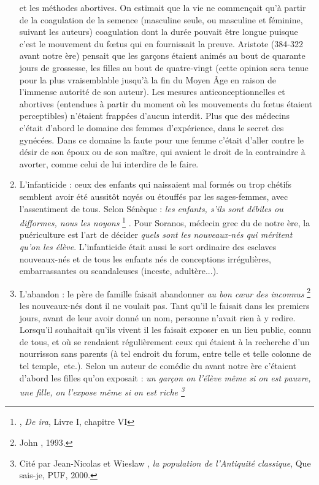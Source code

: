 \begin{enumerate}
et les méthodes abortives. On estimait que la vie ne
commençait qu'à partir de la coagulation de la semence (masculine seule,
ou masculine et féminine, suivant les auteurs) coagulation dont la durée
pouvait être longue puisque c'est le mouvement du fœtus qui en fournissait
la preuve. Aristote (384-322 avant notre ère) pensait que les garçons
étaient animés au bout de quarante jours de grossesse, les filles au bout
de quatre-vingt (cette opinion sera tenue pour la plus vraisemblable jusqu'à
la fin du Moyen Âge en raison de l'immense autorité de son auteur).
Les mesures anticonceptionnelles et abortives (entendues à partir du
moment où les mouvements du fœtus étaient perceptibles) n'étaient
frappées d'aucun interdit. Plus que des médecins c'était d'abord le domaine
des femmes d'expérience, dans le secret des gynécées. Dans ce
domaine la faute pour une femme c'était d'aller contre le désir de son
époux ou de son maître, qui avaient le droit de la contraindre à avorter,
comme celui de lui interdire de le faire.
\item L'infanticide : ceux des enfants qui naissaient mal formés ou
trop chétifs semblent avoir été aussitôt noyés ou étouffés par les sages-femmes,
avec l'assentiment de tous. Selon Sénèque : {\emph{les enfants, s'ils sont
débiles ou difformes, nous les noyons}%
\footnote{, \emph{De ira}, Livre I, chapitre VI}%
}.
Pour \hbox{Soranos}, médecin grec du
 de notre ère, la puériculture est l'art de décider {\emph{quels sont les
nouveaux-nés qui méritent qu'on les élève}}. L'infanticide était aussi le sort ordinaire
des esclaves nouveaux-nés et de tous les enfants nés de conceptions
irrégulières, embarrassantes ou scandaleuses (inceste, adultère...).
\item L'abandon : le père de famille faisait abandonner {\emph{au bon cœur
des inconnus}%
\footnote{John , 1993.}%
} les nouveaux-nés dont il ne voulait pas. Tant qu'il le faisait
dans les premiers jours, avant de leur avoir donné un nom, personne
n'avait rien à y redire. Lorsqu'il souhaitait qu'ils vivent il les faisait exposer
en un lieu public, connu de tous, et où se rendaient régulièrement
ceux qui étaient à la recherche d'un nourrisson sans parents (à tel endroit
du forum, entre telle et telle colonne de tel temple,~etc.). Selon un auteur
de comédie du  avant notre ère c'étaient d'abord les filles
qu'on exposait : {\emph{un garçon on l'élève même si on est pauvre, une fille, on l'expose
même si on est riche%
\footnote{Cité par Jean-Nicolas  et Wieslaw , \emph{la population de l'Antiquité classique}, Que sais-je, PUF, 2000.}%
}}
\end{enumerate}
